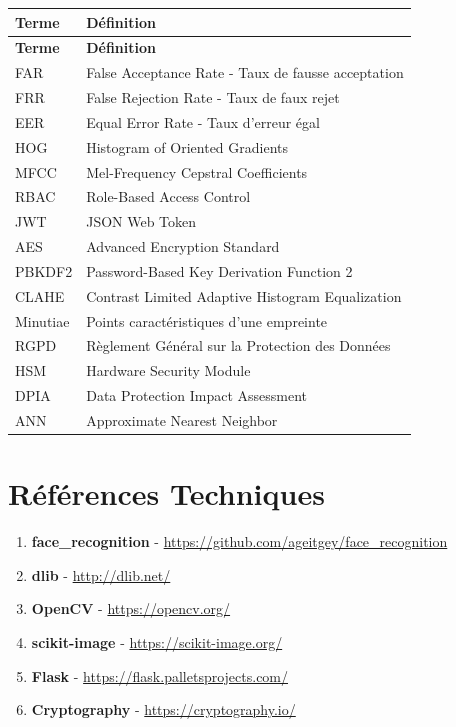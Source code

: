 \documentclass[12pt,a4paper]{report}
\begin{document}
\begin{longtable}{|l|p{10cm}|}
    \hline
    \textbf{Terme} & \textbf{Définition} \\
    \hline
    \endfirsthead
    \hline
    \textbf{Terme} & \textbf{Définition} \\
    \hline
    \endhead
    FAR & False Acceptance Rate - Taux de fausse acceptation \\
    \hline
    FRR & False Rejection Rate - Taux de faux rejet \\
    \hline
    EER & Equal Error Rate - Taux d'erreur égal \\
    \hline
    HOG & Histogram of Oriented Gradients \\
    \hline
    MFCC & Mel-Frequency Cepstral Coefficients \\
    \hline
    RBAC & Role-Based Access Control \\
    \hline
    JWT & JSON Web Token \\
    \hline
    AES & Advanced Encryption Standard \\
    \hline
    PBKDF2 & Password-Based Key Derivation Function 2 \\
    \hline
    CLAHE & Contrast Limited Adaptive Histogram Equalization \\
    \hline
    Minutiae & Points caractéristiques d'une empreinte \\
    \hline
    RGPD & Règlement Général sur la Protection des Données \\
    \hline
    HSM & Hardware Security Module \\
    \hline
    DPIA & Data Protection Impact Assessment \\
    \hline
    ANN & Approximate Nearest Neighbor \\
    \hline
\end{longtable}

\chapter{Références Techniques}

\begin{enumerate}
    \item \textbf{face\_recognition} - \url{https://github.com/ageitgey/face_recognition}
    \item \textbf{dlib} - \url{http://dlib.net/}
    \item \textbf{OpenCV} - \url{https://opencv.org/}
    \item \textbf{scikit-image} - \url{https://scikit-image.org/}
    \item \textbf{Flask} - \url{https://flask.palletsprojects.com/}
    \item \textbf{Cryptography} - \url{https://cryptography.io/}
\end{enumerate}
\end{document}
